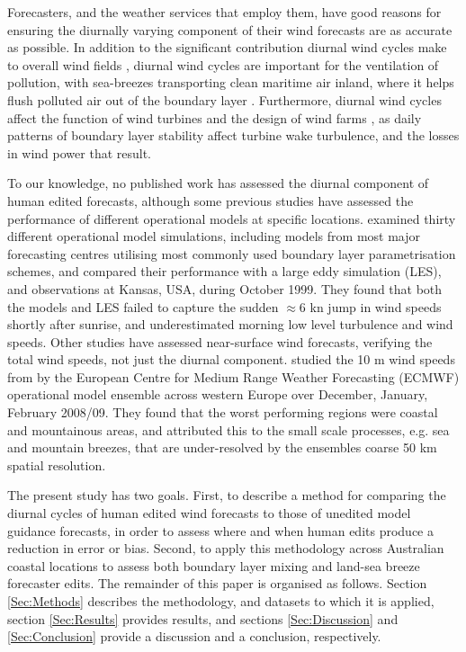 \documentclass[twocol]{ametsoc}
\begin{document}
Forecasters, and the weather services that employ them, have good reasons for ensuring the diurnally varying component of their wind forecasts are as accurate as possible. In addition to the significant contribution diurnal wind cycles make to overall wind fields \citep[e.g.][]{dai99}, diurnal wind cycles are important for the ventilation of pollution, with sea-breezes transporting clean maritime air inland, where it helps flush polluted air out of the boundary layer \citep{miller03, physick92}. Furthermore, diurnal wind cycles affect the function of wind turbines \citep{englberger18} and the design of wind farms \citep{abkar16}, as daily patterns of boundary layer stability affect turbine wake turbulence, and the losses in wind power that result.

To our knowledge, no published work has assessed the diurnal component of human edited forecasts, although some previous studies have assessed the performance of different operational models at specific locations. \citet{svensson11} examined thirty different operational model simulations, including models from most major forecasting centres utilising most commonly used boundary layer parametrisation schemes, and compared their performance with a large eddy simulation (LES), and observations at Kansas, USA, during October 1999. They found that both the models and LES failed to capture the sudden $\approx 6$ kn jump in wind speeds shortly after sunrise, and underestimated morning low level turbulence and wind speeds. Other studies have assessed near-surface wind forecasts, verifying the total wind speeds, not just the diurnal component. \citet{pinson12} studied the 10 m wind speeds from by the European Centre for Medium Range Weather Forecasting (ECMWF) operational model ensemble across western Europe over December, January, February 2008/09. They found that the worst performing regions were coastal and mountainous areas, and attributed this to the small scale processes, e.g. sea and mountain breezes, that are under-resolved by the ensembles coarse 50 km spatial resolution.

The present study has two goals. First, to describe a method for comparing the diurnal cycles of human edited wind forecasts to those of unedited model guidance forecasts, in order to assess where and when human edits produce a reduction in error or bias. Second, to apply this methodology across Australian coastal locations to assess both boundary layer mixing and land-sea breeze forecaster edits. The remainder of this paper is organised as follows. Section \ref{Sec:Methods} describes the methodology, and datasets to which it is applied, section \ref{Sec:Results} provides results, and sections \ref{Sec:Discussion} and \ref{Sec:Conclusion} provide a discussion and a conclusion, respectively.
\end{document}
